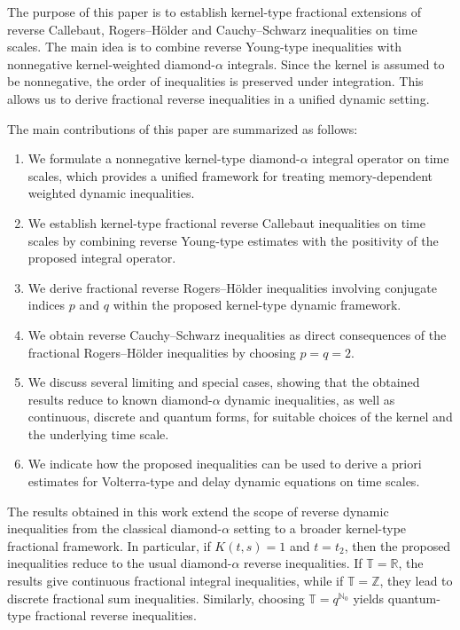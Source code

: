 \documentclass[11pt]{article}
\newcommand{\T}{\mathbb{T}}
\newcommand{\R}{\mathbb{R}}
\begin{document}
The purpose of this paper is to establish kernel-type fractional extensions of reverse Callebaut, Rogers--H\"older and Cauchy--Schwarz inequalities on time scales. The main idea is to combine reverse Young-type inequalities with nonnegative kernel-weighted diamond-$\alpha$ integrals. Since the kernel is assumed to be nonnegative, the order of inequalities is preserved under integration. This allows us to derive fractional reverse inequalities in a unified dynamic setting.

The main contributions of this paper are summarized as follows:
\begin{enumerate}[label=(\roman*)]
    \item We formulate a nonnegative kernel-type diamond-$\alpha$ integral operator on time scales, which provides a unified framework for treating memory-dependent weighted dynamic inequalities.

    \item We establish kernel-type fractional reverse Callebaut inequalities on time scales by combining reverse Young-type estimates with the positivity of the proposed integral operator.

    \item We derive fractional reverse Rogers--H\"older inequalities involving conjugate indices $p$ and $q$ within the proposed kernel-type dynamic framework.

    \item We obtain reverse Cauchy--Schwarz inequalities as direct consequences of the fractional Rogers--H\"older inequalities by choosing $p=q=2$.

    \item We discuss several limiting and special cases, showing that the obtained results reduce to known diamond-$\alpha$ dynamic inequalities, as well as continuous, discrete and quantum forms, for suitable choices of the kernel and the underlying time scale.

    \item We indicate how the proposed inequalities can be used to derive a priori estimates for Volterra-type and delay dynamic equations on time scales.
\end{enumerate}

The results obtained in this work extend the scope of reverse dynamic inequalities from the classical diamond-$\alpha$ setting to a broader kernel-type fractional framework. In particular, if $K(t,s)=1$ and $t=t_{2}$, then the proposed inequalities reduce to the usual diamond-$\alpha$ reverse inequalities. If $\T=\R$, the results give continuous fractional integral inequalities, while if $\T=\mathbb{Z}$, they lead to discrete fractional sum inequalities. Similarly, choosing $\T=q^{\mathbb{N}_{0}}$ yields quantum-type fractional reverse inequalities.
\end{document}
